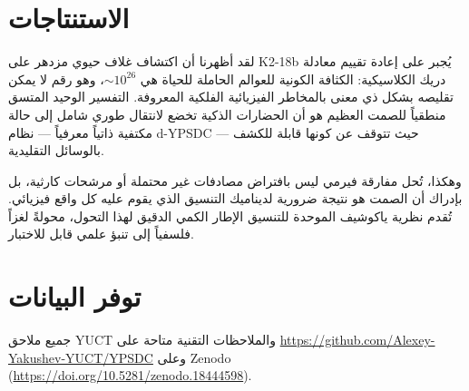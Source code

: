 \documentclass[11pt,a4paper]{article}
\begin{document}
	\section{الاستنتاجات}
	\label{sec:conclusions}
	لقد أظهرنا أن اكتشاف غلاف حيوي مزدهر على K2-18b يُجبر على إعادة تقييم معادلة دريك الكلاسيكية: الكثافة الكونية للعوالم الحاملة للحياة هي \(\sim 10^{26}\)، وهو رقم لا يمكن تقليصه بشكل ذي معنى بالمخاطر الفيزيائية الفلكية المعروفة. التفسير الوحيد المتسق منطقياً للصمت العظيم هو أن الحضارات الذكية تخضع لانتقال طوري شامل إلى حالة مكتفية ذاتياً معرفياً — نظام d-YPSDC — حيث تتوقف عن كونها قابلة للكشف بالوسائل التقليدية.
	
	وهكذا، تُحل مفارقة فيرمي ليس بافتراض مصادفات غير محتملة أو مرشحات كارثية، بل بإدراك أن الصمت هو نتيجة ضرورية لديناميك التنسيق الذي يقوم عليه كل واقع فيزيائي. تُقدم نظرية ياكوشيف الموحدة للتنسيق الإطار الكمي الدقيق لهذا التحول، محولةً لغزاً فلسفياً إلى تنبؤ علمي قابل للاختبار.
	
	\section*{توفر البيانات}
	جميع ملاحق YUCT والملاحظات التقنية متاحة على \url{https://github.com/Alexey-Yakushev-YUCT/YPSDC} وعلى Zenodo (\url{https://doi.org/10.5281/zenodo.18444598}).
	
\end{document}
